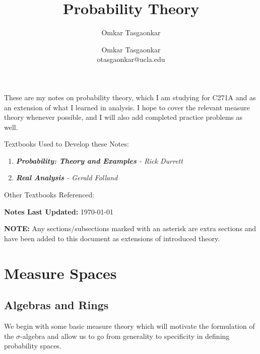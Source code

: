 \documentclass[10pt,letterpaper]{article} %
\author{Omkar Tasgaonkar}
\title{Probability Theory}
\author{Omkar Tasgaonkar \\ \small otasgaonkar@ucla.edu}
\date{}
\begin{document}
\maketitle
These are my notes on probability theory, which I am studying for C271A and as an extension of what I learned in analysis.
I hope to cover the relevant measure theory whenever possible, and I will also add completed practice problems as well.

\begin{tcolorbox}[colback=white, colframe=black, arc=0mm]
Textbooks Used to Develop these Notes:
\begin{enumerate}
\item \textit{\textbf{Probability: Theory and Examples} - Rick Durrett}
\item \textit{\textbf{Real Analysis} - Gerald Folland}
\end{enumerate}
Other Textbooks Referenced:
\end{tcolorbox}
\begin{tcolorbox}[colback=white, colframe=black, arc=0mm]
\textbf{Notes Last Updated:} \today
\end{tcolorbox}
\thispagestyle{firstpage}
\newpage
\begin{tcolorbox}[colback=white, colframe=black, arc=0mm]
\tableofcontents
\end{tcolorbox}
\textbf{NOTE:} Any sections/subsections marked with an asterisk are extra sections and have been added to this document as extensions of introduced theory.
\pagebreak

\section{Measure Spaces}
\subsection{Algebras and Rings}
We begin with some basic measure theory which will motivate the formulation of the $\sigma$-algebra and allow us to go from generality to specificity in defining probability spaces.
\end{document}
